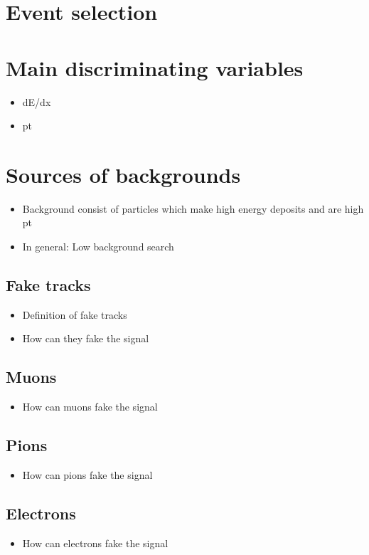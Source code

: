 \section{Event selection}

\section{Main discriminating variables}
\begin{itemize}
\item dE/dx
\item pt
\end{itemize}

\section{Sources of backgrounds}
\begin{itemize}
\item Background consist of particles which make high energy deposits and are high pt
\item In general: Low background search
\end{itemize}
\subsection{Fake tracks}
\begin{itemize}
\item Definition of fake tracks
\item How can they fake the signal
\end{itemize}
\subsection{Muons}
\begin{itemize}
\item How can muons fake the signal
\end{itemize}
\subsection{Pions}
\begin{itemize}
\item How can pions fake the signal
\end{itemize}
\subsection{Electrons}
\begin{itemize}
\item How can electrons fake the signal
\end{itemize}

